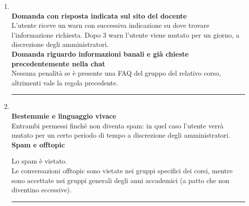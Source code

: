 \documentclass[a4paper, 11pt, oneside, article]{book} %
\begin{document}
\begin{enumerate}
\rmfamily
\item {}\\
	
	\textbf{Domanda con risposta indicata sul sito del docente}\\
	L'utente riceve un warn con successiva indicazione su dove trovare l'informazione richiesta.
	Dopo 3 warn l'utente viene mutato per un giorno, a discrezione degli amministratori.\\
	
	\textbf{Domanda riguardo informazioni banali e già chieste\\ precedentemente nella chat}\\
	Nessuna penalità se è presente una FAQ del gruppo del relativo corso, altrimenti vale la regola precedente.
	
\rule{\linewidth}{0.1mm}

\item  {}\\

	\textbf{Bestemmie e linguaggio vivace}\\
	Entrambi permessi finchè non diventa spam: in quel caso l'utente verrà mutato per un certo periodo di tempo a discrezione degli amministratori.\\
	
	\textbf{Spam e offtopic}
	
	Lo spam è vietato.\\
	Le conversazioni offtopic sono vietate nei gruppi specifici dei corsi, mentre sono accettate nei gruppi generali degli anni accademici (a patto che non diventino eccessive).

\rule{\linewidth}{0.1mm}
	
\end{enumerate}
\end{document}
